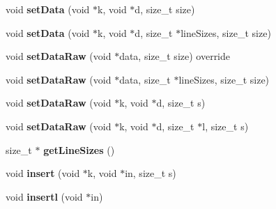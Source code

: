 \begin{DoxyCompactItemize}
\item 
\hypertarget{classfaster_1_1workerFdd_a168689aa68b6a02374d0f78ea0b2a3ed}{}void {\bfseries set\+Data} (void $\ast$k, void $\ast$d, size\+\_\+t size)\label{classfaster_1_1workerFdd_a168689aa68b6a02374d0f78ea0b2a3ed}

\item 
\hypertarget{classfaster_1_1workerFdd_ac399b11ae3a5a385acb52c2547baec51}{}void {\bfseries set\+Data} (void $\ast$k, void $\ast$d, size\+\_\+t $\ast$line\+Sizes, size\+\_\+t size)\label{classfaster_1_1workerFdd_ac399b11ae3a5a385acb52c2547baec51}

\item 
\hypertarget{classfaster_1_1workerFdd_abe1fe4ca054f914d12d2e24bd8ea49df}{}void {\bfseries set\+Data\+Raw} (void $\ast$data, size\+\_\+t size) override\label{classfaster_1_1workerFdd_abe1fe4ca054f914d12d2e24bd8ea49df}

\item 
\hypertarget{classfaster_1_1workerFdd_a60851f472a919037ae93c0ddf2fdbc4c}{}void {\bfseries set\+Data\+Raw} (void $\ast$data, size\+\_\+t $\ast$line\+Sizes, size\+\_\+t size)\label{classfaster_1_1workerFdd_a60851f472a919037ae93c0ddf2fdbc4c}

\item 
\hypertarget{classfaster_1_1workerFdd_af42e9fc7c5a824c63882b5fd6f494556}{}void {\bfseries set\+Data\+Raw} (void $\ast$k, void $\ast$d, size\+\_\+t s)\label{classfaster_1_1workerFdd_af42e9fc7c5a824c63882b5fd6f494556}

\item 
\hypertarget{classfaster_1_1workerFdd_a3247e1b4c7f74766d8f9bfb95ec35783}{}void {\bfseries set\+Data\+Raw} (void $\ast$k, void $\ast$d, size\+\_\+t $\ast$l, size\+\_\+t s)\label{classfaster_1_1workerFdd_a3247e1b4c7f74766d8f9bfb95ec35783}

\item 
\hypertarget{classfaster_1_1workerFdd_a7b11ae170c7047bcefdf58bfac27b605}{}size\+\_\+t $\ast$ {\bfseries get\+Line\+Sizes} ()\label{classfaster_1_1workerFdd_a7b11ae170c7047bcefdf58bfac27b605}

\item 
\hypertarget{classfaster_1_1workerFdd_a168e376cf191c14355f748526861962c}{}void {\bfseries insert} (void $\ast$k, void $\ast$in, size\+\_\+t s)\label{classfaster_1_1workerFdd_a168e376cf191c14355f748526861962c}

\item 
\hypertarget{classfaster_1_1workerFdd_af4ce92cd1a88a5a568df4cb8dd3429ae}{}void {\bfseries insertl} (void $\ast$in)\label{classfaster_1_1workerFdd_af4ce92cd1a88a5a568df4cb8dd3429ae}


\end{DoxyCompactItemize}
